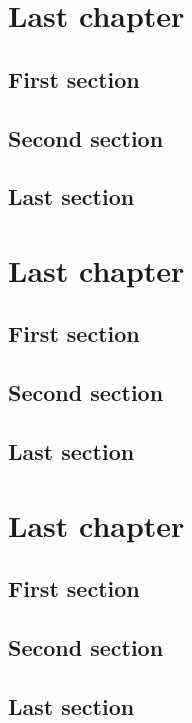 \documentclass{mines-thesis}
\begin{document}
\chapter{Last chapter} \lipsum[1]
\section{First section} \lipsum[2-3]
\section{Second section} \lipsum[4-5]
\section{Last section} \lipsum[6-7]
\chapter{Last chapter} \lipsum[1]
\section{First section} \lipsum[2-3]
\section{Second section} \lipsum[4-5]
\section{Last section} \lipsum[6-7]
\chapter{Last chapter} \lipsum[1]
\section{First section} \lipsum[2-3]
\section{Second section} \lipsum[4-5]
\section{Last section} \lipsum[6-7]
\end{document}
